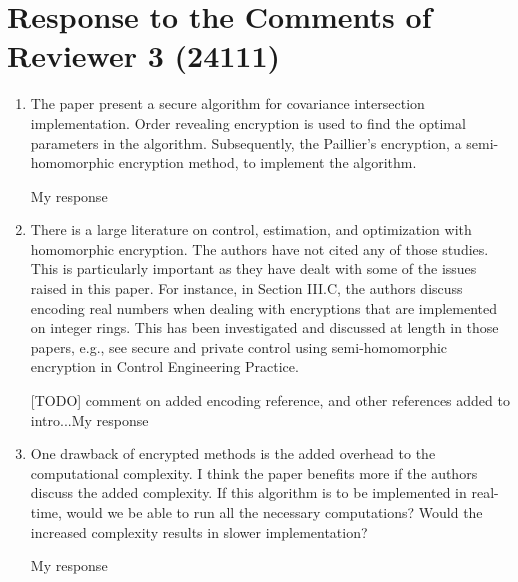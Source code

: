 \documentclass[a4paper]{scrartcl}
\newenvironment{rebuttal}{\begin{enumerate}[label={\color{grey}\thesection.\arabic{enumi}},leftmargin=0pt,ref=\thesection.\arabic{enumi}]}{\end{enumerate}}
\newcommand{\reviewtext}[1]{{\color{nblue} #1}}
\begin{document}



\section*{Response to the Comments of Reviewer 3 (24111)}
\def\thesection{R3}
\begin{rebuttal}
\item \reviewtext{The paper present a secure algorithm for covariance intersection
implementation. Order revealing encryption is used to find the optimal
parameters in the algorithm. Subsequently, the Paillier's encryption, a
semi-homomorphic encryption method, to implement the algorithm. }

My response

\item \reviewtext{There is a large literature on control, estimation, and optimization
with homomorphic encryption. The authors have not cited any of those
studies. This is particularly important as they have dealt with some of
the issues raised in this paper. For instance, in Section III.C, the
authors discuss encoding real numbers when dealing with encryptions
that are implemented on integer rings. This has been investigated and
discussed at length in those papers, e.g., see secure and private
control using semi-homomorphic encryption in Control Engineering
Practice.}

[TODO] comment on added encoding reference, and other references added to intro...My response

\item \reviewtext{One drawback of encrypted methods is the added overhead to the
computational complexity. I think the paper benefits more if the
authors discuss the added complexity. If this algorithm is to be
implemented in real-time, would we be able to run all the necessary
computations? Would the increased complexity results in slower
implementation?}

My response


\end{rebuttal}


\end{document}

